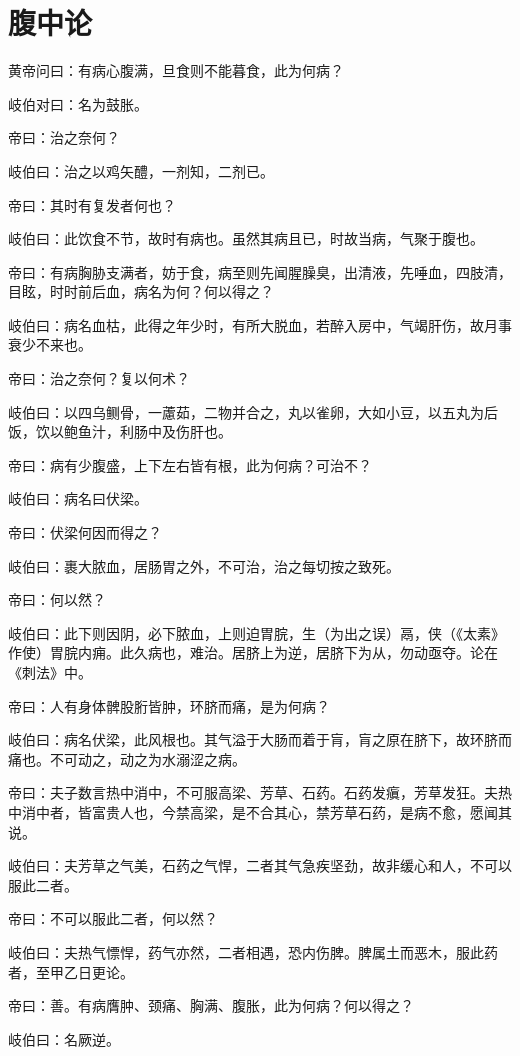 \documentclass{article}%
\begin{document}
\section{腹中论}
黄帝问曰：有病心腹满，旦食则不能暮食，此为何病？

岐伯对曰：名为鼓胀。

帝曰：治之奈何？

岐伯曰：治之以鸡矢醴，一剂知，二剂已。

帝曰：其时有复发者何也？

岐伯曰：此饮食不节，故时有病也。虽然其病且已，时故当病，气聚于腹也。

帝曰：有病胸胁支满者，妨于食，病至则先闻腥臊臭，出清液，先唾血，四肢清，目眩，时时前后血，病名为何？何以得之？

岐伯曰：病名血枯，此得之年少时，有所大脱血，若醉入房中，气竭肝伤，故月事衰少不来也。

帝曰：治之奈何？复以何术？

岐伯曰：以四乌鲗骨，一藘茹，二物并合之，丸以雀卵，大如小豆，以五丸为后饭，饮以鲍鱼汁，利肠中及伤肝也。

帝曰：病有少腹盛，上下左右皆有根，此为何病？可治不？

岐伯曰：病名曰伏梁。

帝曰：伏梁何因而得之？

岐伯曰：裹大脓血，居肠胃之外，不可治，治之每切按之致死。

帝曰：何以然？

岐伯曰：此下则因阴，必下脓血，上则迫胃脘，生（为出之误）鬲，侠（《太素》作使）胃脘内痈。此久病也，难治。居脐上为逆，居脐下为从，勿动亟夺。论在《刺法》中。

帝曰：人有身体髀股胻皆肿，环脐而痛，是为何病？

岐伯曰：病名伏梁，此风根也。其气溢于大肠而着于肓，肓之原在脐下，故环脐而痛也。不可动之，动之为水溺涩之病。

帝曰：夫子数言热中消中，不可服高梁、芳草、石药。石药发瘨，芳草发狂。夫热中消中者，皆富贵人也，今禁高梁，是不合其心，禁芳草石药，是病不愈，愿闻其说。

岐伯曰：夫芳草之气美，石药之气悍，二者其气急疾坚劲，故非缓心和人，不可以服此二者。

帝曰：不可以服此二者，何以然？

岐伯曰：夫热气慓悍，药气亦然，二者相遇，恐内伤脾。脾属土而恶木，服此药者，至甲乙日更论。

帝曰：善。有病膺肿、颈痛、胸满、腹胀，此为何病？何以得之？

岐伯曰：名厥逆。
\end{document}
